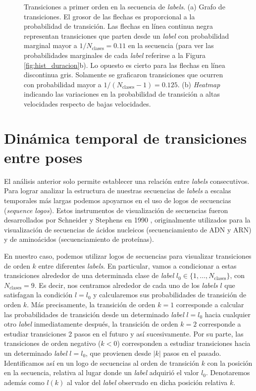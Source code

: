 \begin{figure}[!htbp]
\begin{subfigure}{.45\textwidth}
        \caption{}
    \end{subfigure}
    \caption{ Transiciones a primer orden en la secuencia de \textit{labels}. (a) Grafo de transiciones. El grosor de las flechas es proporcional a la probabilidad de transición. Las flechas en línea continua negra representan transiciones que parten desde un \textit{label} con probabilidad marginal mayor a $1/N_{\mathrm{clases}} = 0.11$ en la secuencia (para ver las probabilidades marginales de cada \textit{label} referirse a la Figura \ref{fig:hist_duracion}b). Lo opuesto es cierto para las flechas en línea discontinua gris. Solamente se graficaron transiciones que ocurren con probabilidad mayor a $1/ (N_{\mathrm{clases}} - 1) = 0.125$. (b) \textit{Heatmap} indicando las variaciones en la probabilidad de transición a altas velocidades respecto de bajas velocidades. }
    \label{fig:trans_grafo_cambios}
\end{figure}

\section{Dinámica temporal de transiciones entre poses}\label{sec:logo}

El análisis anterior solo permite establecer una relación entre \textit{labels} consecutivos. Para lograr analizar la estructura de nuestras secuencias de \textit{labels} a escalas temporales más largas podemos apoyarnos en el uso de logos de secuencias (\textit{sequence logos}). Estos instrumentos de visualización de secuencias fueron desarrollados por Schneider y Stephens en 1990 \cite{schneider_stephens_logo}, originalmente utilizados para la visualización de secuencias de ácidos nucleicos (secuenciamiento de ADN y ARN) y de aminoácidos (secuenciamiento de proteínas).

En nuestro caso, podemos utilizar logos de secuencias para visualizar transiciones de orden $k$ entre diferentes \textit{labels}. En particular, vamos a condicionar a estas transiciones alrededor de una determinada clase de \textit{label} $l_0 \in \{1, \dots, N_{\mathrm{clases}}\}$, con $N_{\mathrm{clases}} = 9$. Es decir, nos centramos alrededor de cada uno de los \textit{labels} $l$ que satisfagan la condición $l=l_0$ y calcularemos sus probabilidades de transición de orden $k$. Más precisamente, la transición de orden $k=1$ corresponde a calcular las probabilidades de transición desde un determinado \textit{label} $l=l_0$ hacia cualquier otro \textit{label} inmediatamente después, la transición de orden $k=2$ corresponde a estudiar transiciones 2 pasos en el futuro y así sucesivamente. Por su parte, las transiciones de orden negativo ($k<0$) corresponden a estudiar transiciones hacia un determinado \textit{label} $l=l_0$, que provienen desde $|k|$ pasos en el pasado. Identificamos así en un logo de secuencias al orden de transición $k$ con la posición en la secuencia, relativa al lugar donde un \textit{label} adquirió el valor $l_0$. Denotaremos además como $l(k)$ al valor del \textit{label} observado en dicha posición relativa $k$.


